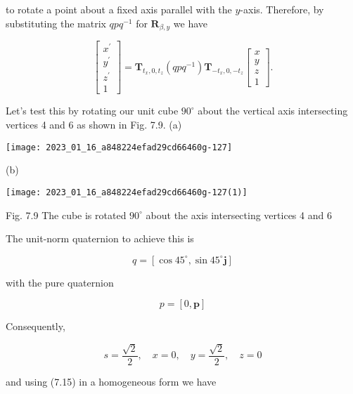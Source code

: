to rotate a point about a fixed axis parallel with the $y$-axis. Therefore, by substituting the matrix $q p q^{-1}$ for $\mathbf{R}_{\beta, y}$ we have

$$
\left[\begin{array}{c}
x^{\prime} \\
y^{\prime} \\
z^{\prime} \\
1
\end{array}\right]=\mathbf{T}_{t_{x}, 0, t_{z}}\left(q p q^{-1}\right) \mathbf{T}_{-t_{x}, 0,-t_{z}}\left[\begin{array}{c}
x \\
y \\
z \\
1
\end{array}\right] .
$$

Let's test this by rotating our unit cube $90^{\circ}$ about the vertical axis intersecting vertices 4 and 6 as shown in Fig. 7.9. (a)

\begin{center}
\texttt{[image: 2023\_01\_16\_a848224efad29cd66460g-127]}
\end{center}

(b)

\begin{center}
\texttt{[image: 2023\_01\_16\_a848224efad29cd66460g-127(1)]}
\end{center}

Fig. 7.9 The cube is rotated $90^{\circ}$ about the axis intersecting vertices 4 and 6

The unit-norm quaternion to achieve this is

$$
q=\left[\cos 45^{\circ}, \sin 45^{\circ} \mathbf{j}\right]
$$

with the pure quaternion

$$
p=[0, \mathbf{p}]
$$

Consequently,

$$
s=\frac{\sqrt{2}}{2}, \quad x=0, \quad y=\frac{\sqrt{2}}{2}, \quad z=0
$$

and using (7.15) in a homogeneous form we have

